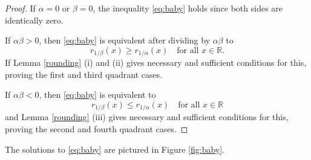 \documentclass[12pt,letterpaper, reqno]{amsart}
\theoremstyle{definition}
\theoremstyle{remark}
\newcommand{\RR}{\ensuremath{\mathbb{R}}}
\begin{document}
\begin{proof}
If $\alpha = 0$ or $\beta = 0$, the inequality \eqref{eq:baby} holds since both sides are identically zero.

If $\alpha\beta>0$, then \eqref{eq:baby} is equivalent after dividing by $\alpha\beta$ to
\[ r_{1/\beta}(x) \geq r_{1/\alpha}(x) \quad \text{for all }x\in\RR.\]
If Lemma \ref{rounding} (i) and (ii) gives necessary and sufficient conditions for this, proving the first and third quadrant cases.

If $\alpha\beta< 0$, then \eqref{eq:baby} is equivalent to
\[ r_{1/\beta}(x) \leq r_{1/\alpha}(x) \quad \text{for all } x \in\RR\]
and Lemma \ref{rounding} (iii) gives necessary and sufficient conditions for this, proving the second and fourth quadrant cases.
\end{proof}
The solutions to \eqref{eq:baby} are pictured in Figure \ref{fig:baby}.
\end{document}
